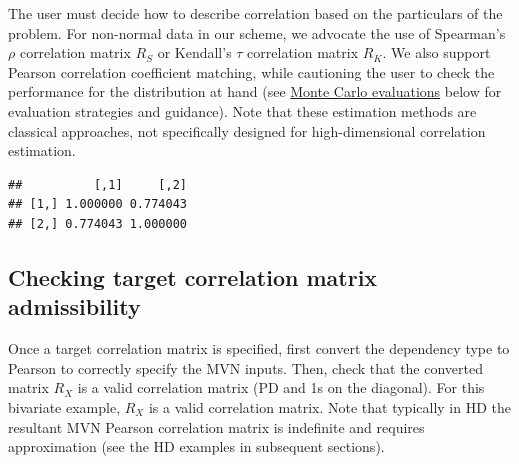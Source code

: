 \documentclass{article}
\newenvironment{Shaded}{\begin{snugshade}}{\end{snugshade}}
\newcommand{\CommentTok}[1]{\textcolor[rgb]{0.56,0.35,0.01}{\textit{#1}}}
\newcommand{\FunctionTok}[1]{\textcolor[rgb]{0.00,0.00,0.00}{#1}}
\newcommand{\NormalTok}[1]{#1}
\newcommand{\OtherTok}[1]{\textcolor[rgb]{0.56,0.35,0.01}{#1}}
\newcommand{\SpecialCharTok}[1]{\textcolor[rgb]{0.00,0.00,0.00}{#1}}
\begin{document}
The user must decide how to describe correlation based on the
particulars of the problem. For non-normal data in our scheme, we
advocate the use of Spearman's \(\rho\) correlation matrix \(R_S\) or
Kendall's \(\tau\) correlation matrix \(R_K\). We also support Pearson
correlation coefficient matching, while cautioning the user to check the
performance for the distribution at hand (see
\protect\hyperlink{simulations}{Monte Carlo evaluations} below for
evaluation strategies and guidance). Note that these estimation methods
are classical approaches, not specifically designed for high-dimensional
correlation estimation.

\begin{Shaded}
\end{Shaded}

\begin{verbatim}
##          [,1]     [,2]
## [1,] 1.000000 0.774043
## [2,] 0.774043 1.000000
\end{verbatim}

\hypertarget{checking-target-correlation-matrix-admissibility}{%
\subsection{Checking target correlation matrix
admissibility}\label{checking-target-correlation-matrix-admissibility}}

Once a target correlation matrix is specified, first convert the
dependency type to Pearson to correctly specify the MVN inputs. Then,
check that the converted matrix \(R_X\) is a valid correlation matrix
(PD and 1s on the diagonal). For this bivariate example, \(R_X\) is a
valid correlation matrix. Note that typically in HD the resultant MVN
Pearson correlation matrix is indefinite and requires approximation (see
the HD examples in subsequent sections).

\begin{Shaded}
\end{Shaded}
\end{document}
